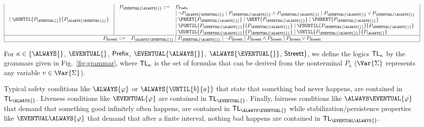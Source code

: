 \documentclass[submission,copyright,creativecommons]{eptcs}
\begin{document}
\begin{figure*}[!th]
\[\begin{array}{|c|c|}
\begin{array}{ll}
		\mid \SUNTIL{P_{\EVENTUAL{}}}{P_{\ALWAYS{\EVENTUAL{}}}}
	\end{array} &
	\begin{array}{ll}
	P_{\EVENTUAL{\ALWAYS{}}} ::= & P_{\sf Prefix}  \\ &
		\mid \neg P_{\ALWAYS{\EVENTUAL{}}}
		\mid P_{\EVENTUAL{\ALWAYS{}}}\wedge P_{\EVENTUAL{\ALWAYS{}}} 
		\mid P_{\EVENTUAL{\ALWAYS{}}}\vee P_{\EVENTUAL{\ALWAYS{}}} \\ &
		\mid \PNEXT{P_{\EVENTUAL{\ALWAYS{}}}} 
		\mid \NEXT{P_{\EVENTUAL{\ALWAYS{}}}} 
		\mid \PSNEXT{P_{\EVENTUAL{\ALWAYS{}}}} \\ &
		\mid    \PUNTIL{P_{\EVENTUAL{\ALWAYS{}}}}{P_{\EVENTUAL{\ALWAYS{}}}} 
		\mid   \PSUNTIL{P_{\EVENTUAL{\ALWAYS{}}}}{P_{\EVENTUAL{\ALWAYS{}}}} \\ &
		\mid    \SUNTIL{P_{\EVENTUAL{\ALWAYS{}}}}{P_{\EVENTUAL{\ALWAYS{}}}} 
		\mid     \UNTIL{P_{\EVENTUAL{\ALWAYS{}}}}{P_{\ALWAYS{}}}
	\end{array}
\\
\hline
\multicolumn{2}{|c|}{\begin{array}{ll}
	P_{\sf Streett} ::= &
	             P_{\ALWAYS{\EVENTUAL{}}}  
		\mid P_{\EVENTUAL{\ALWAYS{}}} 
		\mid \neg P_{\sf Streett}
		\mid P_{\sf Streett} \wedge P_{\sf Streett}
		\mid P_{\sf Streett} \vee P_{\sf Streett}
\end{array}
}
\\
\hline
\end{array}
\]
\caption{Syntactic Characterizations of the Classes of the Temporal Logic Hierarchy}
\label{fig:grammar}
\end{figure*}


\begin{definition} \label{temp_borel_1_def}
For $\kappa\in\{\ALWAYS{}$, $\EVENTUAL{}$, ${\sf Prefix}$, $\EVENTUAL{\ALWAYS{}}$, $\ALWAYS{\EVENTUAL{}}$, ${\sf Streett} \}$, we define the logics ${\sf TL}_\kappa$ by the grammars given in Fig.~\ref{fig:grammar}, where ${\sf TL}_\kappa$ is the set of formulas that can be derived from the nonterminal $P_\kappa$ ($\Var{\Sigma}$ represents any variable $v\in\Var{\Sigma}$).
\end{definition}

\noindent Typical safety conditions like $\ALWAYS{\varphi}$ or $\ALWAYS{\UNTIL{b}{a}}$ that state that something bad never happens, are contained in ${\sf TL}_\ALWAYS{}$. Liveness conditions like $\EVENTUAL{\varphi}$ are contained in ${\sf TL}_\EVENTUAL{}$. Finally, fairness conditions like $\ALWAYS\EVENTUAL{\varphi}$ that demand that something good infinitely often happens, are contained in ${\sf TL}_{\ALWAYS\EVENTUAL{}}$ while stabilization/persistence properties like $\EVENTUAL\ALWAYS{\varphi}$ that demand that after a finite interval, nothing bad happens are contained in ${\sf TL}_{\EVENTUAL\ALWAYS{}}$.
\end{document}
